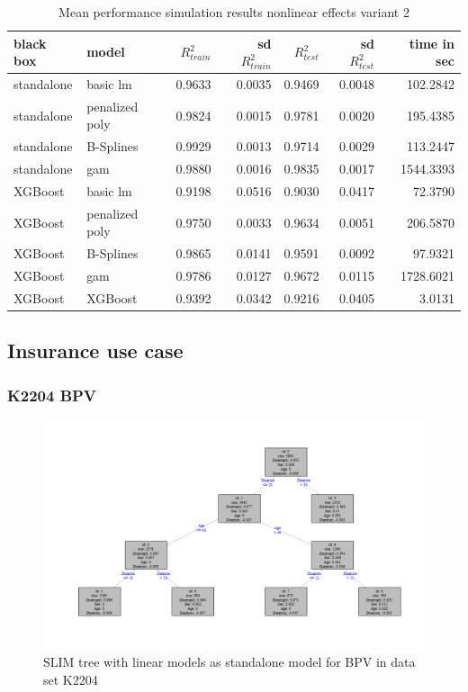 \begin{table}[!htb] 

\centering \footnotesize
\begin{tabular}[t]{l|l|r|r|r|r|r}
\hline
black box & model & $R^2_{train}$  & sd $R^2_{train}$ & $R^2_{test}$ & sd $R^2_{test}$ & time in sec\\
\hline
standalone & basic lm & 0.9633 & 0.0035 & 0.9469 & 0.0048 & 102.2842\\
standalone & penalized poly & 0.9824 & 0.0015 & 0.9781 & 0.0020 & 195.4385\\
standalone & B-Splines & 0.9929 & 0.0013 & 0.9714 & 0.0029 & 113.2447\\
standalone & gam & 0.9880 & 0.0016 & 0.9835 & 0.0017 & 1544.3393\\
\hline
XGBoost & basic lm & 0.9198 & 0.0516 & 0.9030 & 0.0417 & 72.3790\\
XGBoost & penalized poly & 0.9750 & 0.0033 & 0.9634 & 0.0051 & 206.5870\\
XGBoost & B-Splines & 0.9865 & 0.0141 & 0.9591 & 0.0092 & 97.9321\\
XGBoost & gam & 0.9786 & 0.0127 & 0.9672 & 0.0115 & 1728.6021\\
\hline
XGBoost & XGBoost & 0.9392 & 0.0342 & 0.9216 & 0.0405 & 3.0131\\
\hline
\end{tabular}
\caption{Mean performance simulation results nonlinear effects variant 2}
\label{tab:app_nonlinear_performance}
\end{table}



\clearpage
\subsection{Insurance use case}
\subsubsection{K2204 BPV}

 \begin{figure}[!htb]
     \centering     
     \includegraphics[width = 14cm]{Figures/insurance_use_case/k2204_BPV/slim_lm_tree.png}
     \caption{SLIM tree with linear models as standalone model for BPV in data set K2204}
     \label{fig:app_ins_slim_lm_standalone_tree}
 \end{figure}

